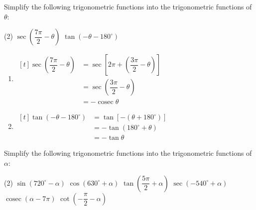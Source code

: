 \documentclass{report}
\begin{document}
\begin{question}
    Simplify the following trigonometric functions into the trigonometric functions of $\theta$:
    \begin{tasks}[label=(\alph*)](2)
            \task $\sec \left(\dfrac{7 \pi}{2}-\theta\right)$
            \task \vspace*{0.5em}$\tan \left(-\theta-180^{\circ}\right)$
        \end{tasks}

    \sol{}
    \begin{enumerate}[label=(\alph*)]
        \item $\begin{aligned}[t] \sec \left(\dfrac{7 \pi}{2}-\theta\right) & =\sec \left[2 \pi+\left(\dfrac{3 \pi}{2}-\theta\right)\right] \\ & =\sec \left(\dfrac{3 \pi}{2}-\theta\right) \\ & =-\operatorname{cosec} \theta\end{aligned}$
        \item $\begin{aligned}[t] \tan \left(-\theta-180^{\circ}\right) & =\tan \left[-\left(\theta+180^{\circ}\right)\right] \\ & =-\tan \left(180^{\circ}+\theta\right) \\ & =-\tan \theta\end{aligned}$
    \end{enumerate}
\end{question}

Simplify the following trigonometric functions into the trigonometric functions of $\alpha$:

\begin{tasks}[label=(\alph*)](2)
        \task $\sin \left(720^{\circ}-\alpha\right)$
        \task $\cos \left(630^{\circ}+\alpha\right)$
        \task $\tan \left(\dfrac{5 \pi}{2}+\alpha\right)$
        \task $\sec \left(-540^{\circ}+\alpha\right)$
        \task $\operatorname{cosec}(\alpha-7 \pi)$
        \task $\cot \left(-\dfrac{\pi}{2}-\alpha\right)$
    \end{tasks}
\end{document}
